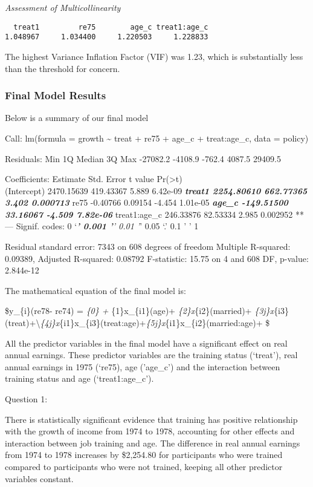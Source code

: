 \documentclass[
]{article}
\begin{document}
\emph{Assessment of Multicollinearity}

\begin{verbatim}
  treat1         re75        age_c treat1:age_c 
1.048967     1.034400     1.220503     1.228833 
\end{verbatim}

The highest Variance Inflation Factor (VIF) was 1.23, which is
substantially less than the threshold for concern.

\hypertarget{final-model-results}{%
\subsubsection{Final Model Results}\label{final-model-results}}

Below is a summary of our final model

Call: lm(formula = growth \textasciitilde{} treat + re75 + age\_c +
treat:age\_c, data = policy)

Residuals: Min 1Q Median 3Q Max -27082.2 -4108.9 -762.4 4087.5 29409.5

Coefficients: Estimate Std. Error t value
Pr(\textgreater\textbar t\textbar)\\
(Intercept) 2470.15639 419.43367 5.889 6.42e-09 \textbf{\emph{ treat1
2254.80610 662.77365 3.402 0.000713 }} re75 -0.40766 0.09154 -4.454
1.01e-05 \textbf{\emph{ age\_c -149.51500 33.16067 -4.509 7.82e-06 }}
treat1:age\_c 246.33876 82.53334 2.985 0.002952 ** --- Signif. codes: 0
`\emph{\textbf{' 0.001 '}' 0.01 '}' 0.05 `.' 0.1 ' ' 1

Residual standard error: 7343 on 608 degrees of freedom Multiple
R-squared: 0.09389, Adjusted R-squared: 0.08792 F-statistic: 15.75 on 4
and 608 DF, p-value: 2.844e-12

The mathematical equation of the final model is:

\$y\_\{i\}(re78- re74) = \beta \emph{\{0\} + \beta }\{1\}x\_\{i1\}(age)+
\beta \emph{\{2\}x}\{i2\}(married)+
\beta \emph{\{3j\}x}\{i3\}(treat)+\textbackslash{}\beta \emph{\{4j\}x}\{i1\}x\_\{i3\}(treat:age)+\beta \emph{\{5j\}x}\{i1\}x\_\{i2\}(married:age)+
\epsilon \$

All the predictor variables in the final model have a significant effect
on real annual earnings. These predictor variables are the training
status (`treat'), real annual earnings in 1975 (`re75), age ('age\_c')
and the interaction between training status and age (`treat1:age\_c').

Question 1:

There is statistically significant evidence that training has positive
relationship with the growth of income from 1974 to 1978, accounting for
other effects and interaction between job training and age. The
difference in real annual earnings from 1974 to 1978 increases by
\$2,254.80 for participants who were trained compared to participants
who were not trained, keeping all other predictor variables constant.
\end{document}
